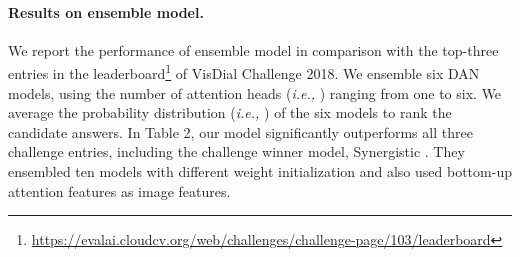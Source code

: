 \documentclass[11pt,a4paper]{article}
\begin{document}
\begin{table}
\centering
{}
\caption{Test-std performance of ensemble model on VisDial v1.0 dataset. We cite top-three entries from VisDial Challenge 2018 Leaderboard.}
\label{tab:t3}
\end{table}

\paragraph{Results on ensemble model.} We report the performance of ensemble model in comparison with the top-three entries in the leaderboard\footnote{\url{https://evalai.cloudcv.org/web/challenges/challenge-page/103/leaderboard}} of VisDial Challenge 2018. We ensemble six DAN models, using the number of attention heads ({\it i.e.,} ) ranging from one to six. We average the probability distribution ({\it i.e.,} ) of the six models to rank the candidate answers. In Table 2, our model significantly outperforms all three challenge entries, including the challenge winner model, Synergistic \cite{guo2019image}. They ensembled ten models with different weight initialization and also used bottom-up attention features \cite{Anderson2017up-down} as image features. 
\end{document}
